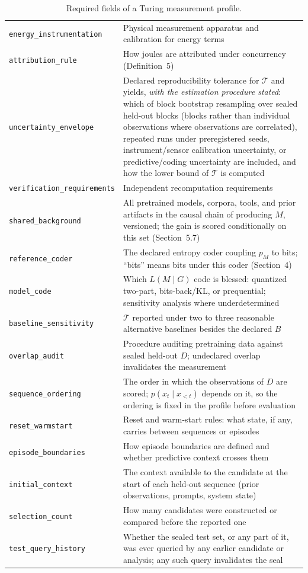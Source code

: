 \documentclass[11pt]{article}
\begin{document}
\begin{table}[h]
\begin{tabularx}{\textwidth}{lY}
\texttt{energy\_instrumentation} & Physical measurement apparatus and calibration for energy terms \\
\texttt{attribution\_rule} & How joules are attributed under concurrency (Definition~5) \\
\texttt{uncertainty\_envelope} & Declared reproducibility tolerance for \(\mathcal{T}\) and yields, \textit{with the estimation procedure stated}: which of block bootstrap resampling over sealed held-out blocks (blocks rather than individual observations where observations are correlated), repeated runs under preregistered seeds, instrument/sensor calibration uncertainty, or predictive/coding uncertainty are included, and how the lower bound of \(\mathcal{T}\) is computed \\
\texttt{verification\_requirements} & Independent recomputation requirements \\
\texttt{shared\_background} & All pretrained models, corpora, tools, and prior artifacts in the causal chain of producing \(M\), versioned; the gain is scored conditionally on this set (Section~5.7) \\
\texttt{reference\_coder} & The declared entropy coder coupling \(p_M\) to bits; ``bits'' means bits under this coder (Section~4) \\
\texttt{model\_code} & Which \(L(M\mid G)\) code is blessed: quantized two-part, bits-back/KL, or prequential; sensitivity analysis where underdetermined \\
\texttt{baseline\_sensitivity} & \(\mathcal{T}\) reported under two to three reasonable alternative baselines besides the declared \(B\) \\
\texttt{overlap\_audit} & Procedure auditing pretraining data against sealed held-out \(D\); undeclared overlap invalidates the measurement \\
\texttt{sequence\_ordering} & The order in which the observations of \(D\) are scored; \(p(x_t\mid x_{<t})\) depends on it, so the ordering is fixed in the profile before evaluation \\
\texttt{reset\_warmstart} & Reset and warm-start rules: what state, if any, carries between sequences or episodes \\
\texttt{episode\_boundaries} & How episode boundaries are defined and whether predictive context crosses them \\
\texttt{initial\_context} & The context available to the candidate at the start of each held-out sequence (prior observations, prompts, system state) \\
\texttt{selection\_count} & How many candidates were constructed or compared before the reported one \\
\texttt{test\_query\_history} & Whether the sealed test set, or any part of it, was ever queried by any earlier candidate or analysis; any such query invalidates the seal \\
\bottomrule
\end{tabularx}
\caption{Required fields of a Turing measurement profile.}
\end{table}
\end{document}
